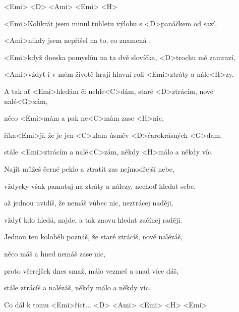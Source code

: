 

<Emi> <D> <Ami> <Emi> <H>

\zs
<Emi>Kolikrát jsem minul tuhletu výlohu s <D>panáčkem od sazí,

<Ami>nikdy jsem nepřišel na to, co znamená ,

<Emi>když dneska pomyslím na ta dvě slovíčka, <D>trochu mě zamrazí,

<Ami>vždyť i v mém životě hrají hlavní roli <Emi>ztráty a nále<H>zy.
\ks

\zr
A tak ať <Emi>hledám či nehle<C>dám, staré <D>ztrácím, nové nalé<G>zám,

něco <Emi>mám a pak ne<C>mám zase <H>nic,

říka<Emi>jí, že je jen <C>klam úsměv <D>čarokrásných <G>dam,

stále <Emi>ztrácím a nalé<C>zám, někdy <H>málo a někdy víc.
\kr

\zs
Najít můžeš černé peklo a ztratit zas nejmodřejší nebe,

vždycky však pamatuj na ztráty a nálezy, nechoď hledat sebe,

až jednou uvidíš, že nemáš vůbec nic, neztrácej naději,

vždyť kdo hledá, najde, a tak znovu hledat začínej raději.
\ks

\zr
Jednou ten koloběh poznáš, že staré ztrácíš, nové nalézáš,

něco máš a hned nemáš zase nic,

proto včerejšek dnes smaž, málo vezmeš a snad více dáš,

stále ztrácíš a nalézáš, někdy málo a někdy víc.
\kr

Co dál k tomu <Emi>říct... <D> <Ami> <Emi> <H> <Emi>

\kp
